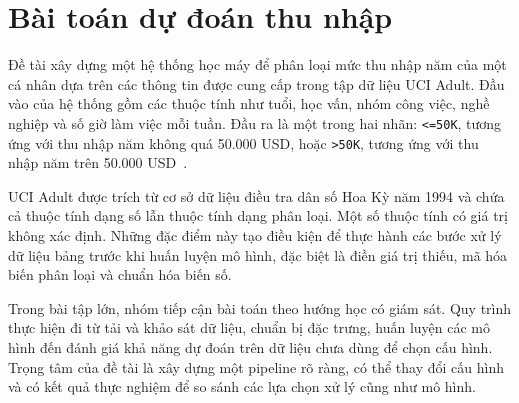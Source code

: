 \section{Bài toán dự đoán thu nhập}
\label{sec:1_1}
Đề tài xây dựng một hệ thống học máy để phân loại mức thu nhập năm của một cá nhân dựa trên các thông tin được cung cấp trong tập dữ liệu UCI Adult. Đầu vào của hệ thống gồm các thuộc tính như tuổi, học vấn, nhóm công việc, nghề nghiệp và số giờ làm việc mỗi tuần. Đầu ra là một trong hai nhãn: \texttt{<=50K}, tương ứng với thu nhập năm không quá 50.000 USD, hoặc \texttt{>50K}, tương ứng với thu nhập năm trên 50.000 USD~\cite{uci-adult}.

UCI Adult được trích từ cơ sở dữ liệu điều tra dân số Hoa Kỳ năm 1994 và chứa cả thuộc tính dạng số lẫn thuộc tính dạng phân loại. Một số thuộc tính có giá trị không xác định. Những đặc điểm này tạo điều kiện để thực hành các bước xử lý dữ liệu bảng trước khi huấn luyện mô hình, đặc biệt là điền giá trị thiếu, mã hóa biến phân loại và chuẩn hóa biến số.

Trong bài tập lớn, nhóm tiếp cận bài toán theo hướng học có giám sát. Quy trình thực hiện đi từ tải và khảo sát dữ liệu, chuẩn bị đặc trưng, huấn luyện các mô hình đến đánh giá khả năng dự đoán trên dữ liệu chưa dùng để chọn cấu hình. Trọng tâm của đề tài là xây dựng một pipeline rõ ràng, có thể thay đổi cấu hình và có kết quả thực nghiệm để so sánh các lựa chọn xử lý cũng như mô hình.
